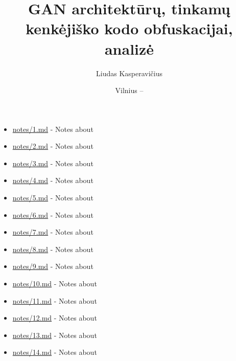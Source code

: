 \documentclass[
    lithuanian, %
]{VUMIFPSkursinis}
\title{GAN architektūrų, tinkamų kenkėjiško kodo obfuskacijai, analizė}
\author{Liudas Kasperavičius}
\date{Vilnius – \the\year}
\begin{document}


\maketitle

\tableofcontents


\begin{itemize}
    \item \url{notes/1.md} - Notes about \cite{nguyenGenerativeAdversarialNetworks2023}
    \item \url{notes/2.md} - Notes about \cite{zhongMalFoxCamouflagedAdversarial2024}
    \item \url{notes/3.md} - Notes about \cite{zhongReinforcementLearningBased2022}
    \item \url{notes/4.md} - Notes about \cite{kawaiImprovedMalGANAvoiding2019}
    \item \url{notes/5.md} - Notes about \cite{huGeneratingAdversarialMalware2017}
    \item \url{notes/6.md} - Notes about \cite{fangEvadingMalwareEngines2019}
    \item \url{notes/7.md} - Notes about \cite{zhuNgramMalGANEvading2022}
    \item \url{notes/8.md} - Notes about \cite{castroAIMEDEvolvingMalware2019}
    \item \url{notes/9.md} - Notes about \cite{andersonLearningEvadeStatic2018}
    \item \url{notes/10.md} - Notes about \cite{demetrioAdversarialEXEmplesSurvey2021}
    \item \url{notes/11.md} - Notes about \cite{yusteOptimizationCodeCaves2022}
    \item \url{notes/12.md} - Notes about \cite{chenInfoGANInterpretableRepresentation2016a}
    \item \url{notes/13.md} - Notes about \cite{demetrioFunctionalityPreservingBlackBoxOptimization2021}
    \item \url{notes/14.md} - Notes about \cite{rosenbergGenericBlackBoxEndEnd2018}
\end{itemize}




\printbibliography[heading=bibintoc]

\printacronyms[heading=none]

\end{document}
